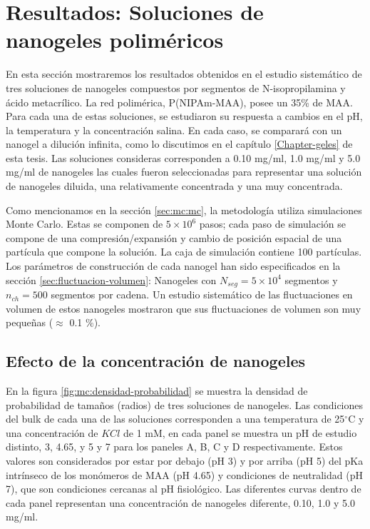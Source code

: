 	\section{Resultados: Soluciones de nanogeles polim\'ericos}
	
	En esta secci\'on mostraremos los resultados obtenidos en el estudio sistem\'atico de tres soluciones de nanogeles compuestos por segmentos de N-isopropilamina y \'acido metacr\'ilico. La red polim\'erica, P(NIPAm-MAA), posee un 35\% de MAA. Para cada una de estas soluciones, se estudiaron su respuesta a cambios en el pH, la temperatura y la concentraci\'on salina. En cada caso, se comparar\'a con un nanogel a diluci\'on infinita, como lo discutimos en el cap\'itulo \ref{Chapter-geles} de esta tesis. Las soluciones consideras corresponden a 0.10 mg/ml, 1.0 mg/ml y 5.0 mg/ml  de nanogeles las cuales fueron seleccionadas para representar una soluci\'on de nanogeles diluida, una relativamente concentrada y una muy concentrada.
	
	Como mencionamos en la secci\'on \ref{sec:mc:mc}, la metodolog\'ia utiliza simulaciones Monte Carlo. Estas se componen de $5\times 10^6$ pasos; cada paso de simulaci\'on se compone de una compresi\'on/expansi\'on y cambio de posici\'on espacial de una part\'icula que compone la soluci\'on. La caja de simulaci\'on contiene 100 part\'iculas. Los par\'ametros de construcci\'on de cada nanogel han sido especificados en la secci\'on \ref{sec:fluctuacion-volumen}: Nanogeles con $N_{seg} = 5 \times10^4$ segmentos y $n_{ch} = 500$ segmentos por cadena. Un estudio sistem\'atico de las fluctuaciones en volumen de estos nanogeles mostraron que sus fluctuaciones de volumen son muy peque\~nas ($\approx$ 0.1 $\%$). %
	
	
	
	\subsection{Efecto de la concentraci\'on de nanogeles}
	En la figura \ref{fig:mc:densidad-probabilidad} se muestra la densidad de probabilidad de tama\~nos (radios) de tres soluciones de nanogeles. Las condiciones del bulk de cada una de las soluciones corresponden a una temperatura de 25$^\circ$C y una concentraci\'on de $KCl$ de 1 mM, en cada panel se muestra un pH de estudio distinto, 3, 4.65, y 5 y 7 para los paneles A, B, C y D respectivamente. Estos valores son considerados por estar por debajo (pH 3) y por arriba (pH 5) del pKa intr\'inseco de los mon\'omeros de MAA (pH 4.65) y condiciones de neutralidad (pH 7), que son condiciones cercanas al pH fisiol\'ogico. Las diferentes curvas dentro de cada panel representan una concentraci\'on de nanogeles diferente, 0.10, 1.0 y 5.0 mg/ml.
	
